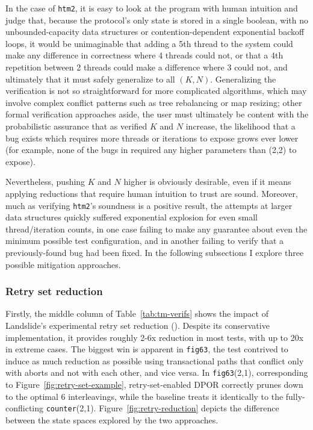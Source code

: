 In the case of {\tt htm2},
it is easy to look at the program with human intuition and judge that,
because the protocol's only state is stored in a single boolean,
with no unbounded-capacity data structures or
contention-dependent exponential backoff loops,
it would be unimaginable that adding a 5th thread to the system
could make any difference in correctness where 4 threads could not,
or that a 4th repetition between 2 threads could make a difference where 3 could not,
and ultimately that it must safely generalize to all $(K, N)$.
Generalizing the verification is not so straightforward
for more complicated algorithms,
which may involve complex conflict patterns such as tree rebalancing or map resizing;
other formal verification approaches aside,
the user must ultimately be content with the probabilistic assurance that
as verified $K$ and $N$ increase,
the likelihood that a bug exists which requires more threads or iterations to expose grows ever lower
(for example, none of the bugs in \sect{\ref{sec:tm-eval-bugs}} required any higher parameters than (2,2) to expose).

Nevertheless, pushing $K$ and $N$ higher is obviously desirable,
even if it means applying reductions that require human intuition to trust are sound.
Moreover, much as verifying {\tt htm2}'s soundness is a positive result,
the attempts at larger data structures quickly suffered exponential explosion
for even small thread/iteration counts,
in one case failing to make any guarantee about even the minimum possible test configuration,
and in another failing to verify that a previously-found bug had been fixed.
In the following subsections I explore three possible mitigation approaches.

\subsubsection{Retry set reduction}
\label{sec:tm-eval-retrysets}

Firstly, the middle column of Table~\ref{tab:tm-verifs}
shows the impact of Landslide's experimental retry set reduction (\sect{\ref{sec:tm-retrysets}}).
Despite its conservative implementation,
it provides roughly 2-6x reduction in most tests, with up to 20x in extreme cases.
The biggest win is apparent in {\tt fig63},
the test contrived to induce as much reduction as possible
using transactional paths that conflict only with aborts and not with each other, and vice versa.
In {\tt fig63}(2,1), corresponding to Figure~\ref{fig:retry-set-example},
retry-set-enabled DPOR correctly prunes down to the optimal 6 interleavings,
while the baseline treats it identically to the fully-conflicting {\tt counter}(2,1).
Figure~\ref{fig:retry-reduction} depicts the difference between the state spaces explored by the two approaches.

